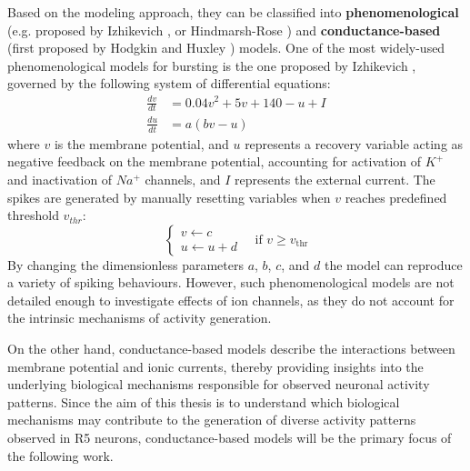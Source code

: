 \documentclass[../main.tex]{subfiles}
\begin{document}
Based on the modeling approach, they can be classified into \textbf{phenomenological} (e.g. proposed by Izhikevich \parencite{izhikevichSimpleModelSpiking2003,izhikevichNEURALEXCITABILITYSPIKING2000}, or Hindmarsh-Rose \parencite{wangGenesisBurstingOscillations1993}) and \textbf{conductance-based} (first proposed by Hodgkin and Huxley \parencite{hodgkinQuantitativeDescriptionMembrane1952}) models. One of the most widely-used phenomenological models for bursting is the one proposed by Izhikevich \parencite{izhikevichSimpleModelSpiking2003}, governed by the following system of differential equations:
\begin{align}
    \frac{dv}{dt}&=0.04 v^2 + 5v + 140 - u + I \label{eq:izhikevich_model_v} \\
    \frac{du}{dt}&=a(bv-u) \label{eq:izhikevich_model_u}
\end{align}
where $v$ is the membrane potential, and $u$ represents a recovery variable acting as negative feedback on the membrane potential, accounting for activation of $K^+$ and inactivation of $Na^+$ channels, and $I$ represents the external current. The spikes are generated by manually resetting variables when $v$ reaches predefined threshold $v_{thr}$:
\begin{equation*}
    \left\{
    \begin{array}{l}
    v \leftarrow c \\
    u \leftarrow u + d
    \end{array}
    \right.
    \quad \text{if } v \geq v_{\text{thr}}
\end{equation*}
By changing the dimensionless parameters $a$, $b$, $c$, and $d$ the model can reproduce a variety of spiking behaviours. However, such phenomenological models are not detailed enough to investigate effects of ion channels, as they do not account for the intrinsic mechanisms of activity generation.

On the other hand, conductance-based models describe the interactions between membrane potential and ionic currents, thereby providing insights into the underlying biological mechanisms responsible for observed neuronal activity patterns. Since the aim of this thesis is to understand which biological mechanisms may contribute to the generation of diverse activity patterns observed in R5 neurons, conductance-based models will be the primary focus of the following work.
\end{document}
